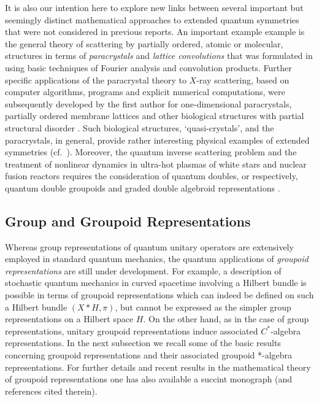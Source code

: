 \documentclass[12pt]{article}
\theoremstyle{plain}
\theoremstyle{definition}
\numberwithin{equation}{section}
\begin{document}
It is also our intention here to explore new links between several important but seemingly distinct mathematical approaches to extended quantum symmetries
that were not considered in previous reports.  An important example example is the general theory of scattering by partially ordered, atomic or molecular,
structures in terms of \emph{paracrystals} and \emph{lattice convolutions} that was formulated in  \cite{Hosemann-Bagchi62} using basic techniques of Fourier analysis and convolution products. Further specific applications of the paracrystal theory to $X$-ray scattering, based on computer algorithms, programs and explicit numerical computations, were subsequently developed by the first author \cite{Baianu74} for one-dimensional paracrystals, partially ordered membrane lattices \cite{Baianu78} and other biological structures with partial structural disorder \cite{Baianu80}. Such biological structures, `quasi-crystals', and the paracrystals, in general, provide rather interesting physical examples of  extended symmetries (cf.~\cite{Hindeleh-Hosemann88}). Moreover, the quantum inverse scattering problem and the treatment of nonlinear dynamics in ultra-hot plasmas of white stars and nuclear fusion reactors requires the consideration of quantum doubles, or respectively,  quantum double groupoids and graded double algebroid representations \cite{BGB1}. 

\subsection{Group and Groupoid Representations}

Whereas group representations of quantum unitary operators are extensively employed in standard quantum mechanics, the quantum applications of
\emph{groupoid representations} are still under development. For example, a description of stochastic quantum
mechanics in curved spacetime \cite{Drechsler-Tuckey96} involving a Hilbert bundle is possible in terms of groupoid representations which can indeed be defined on such a Hilbert bundle $(X*H,\pi)$, but cannot be expressed as the simpler group representations on a Hilbert space $H$. On the other hand, as in the case of group representations, unitary
groupoid representations induce associated $C^*$-algebra representations. In the next subsection we recall some of the basic results concerning groupoid representations and their associated groupoid *-algebra representations. For further details and recent results in the mathematical theory of groupoid representations one has also available a succint monograph \cite{BRM2k3} (and references cited therein).
\end{document}

